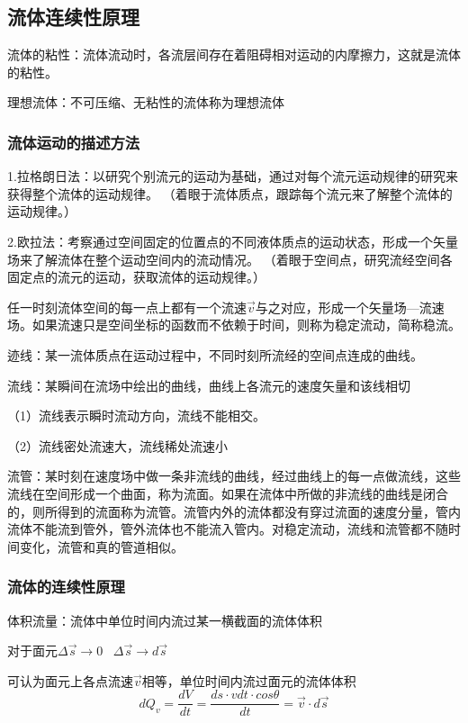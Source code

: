 \documentclass[UTF8]{article}
\begin{document}
\subsection{流体连续性原理}

    流体的粘性：流体流动时，各流层间存在着阻碍相对运动的内摩擦力，这就是流体的粘性。

    理想流体：不可压缩、无粘性的流体称为理想流体

\subsubsection{流体运动的描述方法}

    1.拉格朗日法：以研究个别流元的运动为基础，通过对每个流元运动规律的研究来获得整个流体的运动规律。
    （着眼于流体质点，跟踪每个流元来了解整个流体的运动规律。）

    2.欧拉法：考察通过空间固定的位置点的不同液体质点的运动状态，形成一个矢量场来了解流体在整个运动空间内的流动情况。
    （着眼于空间点，研究流经空间各固定点的流元的运动，获取流体的运动规律。）

    任一时刻流体空间的每一点上都有一个流速$\vec{v}$与之对应，形成一个矢量场—流速场。如果流速只是空间坐标的函数而不依赖于时间，则称为稳定流动，简称稳流。

    迹线：某一流体质点在运动过程中，不同时刻所流经的空间点连成的曲线。

    流线：某瞬间在流场中绘出的曲线，曲线上各流元的速度矢量和该线相切
    
    （1）流线表示瞬时流动方向，流线不能相交。
    
    （2）流线密处流速大，流线稀处流速小

    流管：某时刻在速度场中做一条非流线的曲线，经过曲线上的每一点做流线，这些流线在空间形成一个曲面，称为流面。如果在流体中所做的非流线的曲线是闭合的，则所得到的流面称为流管。流管内外的流体都没有穿过流面的速度分量，管内流体不能流到管外，管外流体也不能流入管内。对稳定流动，流线和流管都不随时间变化，流管和真的管道相似。
    
\subsubsection{流体的连续性原理}

    体积流量：流体中单位时间内流过某一横截面的流体体积

    对于面元$\Delta \vec{s} \rightarrow 0\;\;\;\Delta \vec{s}\rightarrow d\vec{s}$
    
    可认为面元上各点流速$\vec{v}$相等，单位时间内流过面元的流体体积
    \[dQ_v = \frac{dV}{dt} = \frac{ds\cdot vdt\cdot cos\theta}{dt} = \vec{v}\cdot d\vec{s}\]
\end{document}
